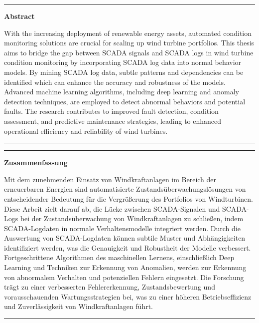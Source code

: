 \documentclass[a4paper,11pt,twoside]{ThesisStyle}
\begin{document}



\dominitoc


\cleardoublepage
\begin{vcenterpage}
\noindent\rule[2pt]{\textwidth}{0.5pt}
\begin{center}
{\large\textbf{Abstract\\}}
\end{center}
With the increasing deployment of renewable energy assets, automated condition monitoring solutions are crucial for scaling up wind turbine portfolios. 
This thesis aims to bridge the gap between SCADA signals and SCADA logs in wind turbine condition monitoring by incorporating SCADA log data into normal behavior models. 
By mining SCADA log data, subtle patterns and dependencies can be identified which can enhance the accuracy and robustness of the models. 
Advanced machine learning algorithms, including deep learning and anomaly detection techniques, are employed to detect abnormal behaviors and potential faults. 
The research contributes to improved fault detection, condition assessment, and predictive maintenance strategies, leading to enhanced operational efficiency and reliability of wind turbines.
\noindent\rule[2pt]{\textwidth}{0.5pt}
\end{vcenterpage}

\clearpage
\begin{vcenterpage}
\noindent\rule[2pt]{\textwidth}{0.5pt}
\begin{center}
{\large\textbf{Zusammenfassung\\}}
\end{center}
Mit dem zunehmenden Einsatz von Windkraftanlagen im Bereich der erneuerbaren Energien sind automatisierte Zustandsüberwachungslösungen von entscheidender Bedeutung für die Vergrößerung des Portfolios von Windturbinen. 
Diese Arbeit zielt darauf ab, die Lücke zwischen SCADA-Signalen und SCADA-Logs bei der Zustandsüberwachung von Windkraftanlagen zu schließen, indem SCADA-Logdaten in normale Verhaltensmodelle integriert werden. 
Durch die Auswertung von SCADA-Logdaten können subtile Muster und Abhängigkeiten identifiziert werden, was die Genauigkeit und Robustheit der Modelle verbessert. 
Fortgeschrittene Algorithmen des maschinellen Lernens, einschließlich Deep Learning und Techniken zur Erkennung von Anomalien, werden zur Erkennung von abnormalem Verhalten und potenziellen Fehlern eingesetzt. 
Die Forschung trägt zu einer verbesserten Fehlererkennung, Zustandsbewertung und vorausschauenden Wartungsstrategien bei, was zu einer höheren Betriebseffizienz und Zuverlässigkeit von Windkraftanlagen führt.
\noindent\rule[2pt]{\textwidth}{0.5pt}
\end{vcenterpage}
\end{document}
